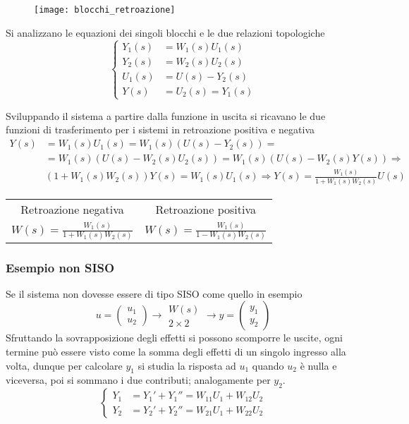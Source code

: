 \begin{figure}[h]
\centering
\texttt{[image: blocchi\_retroazione]}
\end{figure}

Si analizzano le equazioni dei singoli blocchi e le due relazioni topologiche
$$
\left\{\begin{aligned}
Y_1(s) &= W_1(s) U_1(s) \\
Y_2(s) &= W_2(s) U_2(s) \\
U_1(s) &= U(s) - Y_2(s) \\
Y(s) &= U_2(s) = Y_1(s)
\end{aligned}\right.
$$

Sviluppando il sistema a partire dalla funzione in uscita si ricavano le due
funzioni di trasferimento per i sistemi in retroazione positiva e negativa
$$
\begin{aligned}
Y(s) & = W_1(s) U_1(s) = W_1(s) (U(s) - Y_2(s)) =\\
&=
W_1(s) (U(s) - W_2(s)U_2(s)) = W_1(s)(U(s)-W_2(s)Y(s)) \Rightarrow \\
&(1+W_1(s)W_2(s))Y(s) = W_1(s) U_1(s) \Rightarrow
Y(s) = \frac{W_1(s)}{1+W_1(s)W_2(s)}U(s)
\end{aligned}
$$
\begin{table}[h]
\centering
\begin{tabular}{c|c}
Retroazione negativa & Retroazione positiva \\
$W(s) = \frac{W_1(s)}{1+W_1(s)W_2(s)}$ &
$W(s) = \frac{W_1(s)}{1-W_1(s)W_2(s)}$
\end{tabular}
\end{table}

\subsubsection{Esempio non SISO}
Se il sistema non dovesse essere di tipo SISO come quello in esempio
$$
u=\begin{pmatrix}
u_1 \\ u_2
\end{pmatrix} \rightarrow
\begin{matrix}W(s)\\2\times2
\end{matrix}
\rightarrow y = \begin{pmatrix}
y_1 \\ y_2
\end{pmatrix}
$$
Sfruttando la sovrapposizione degli effetti si possono scomporre le uscite,
ogni termine può essere visto come la somma degli effetti di un singolo
ingresso alla volta, dunque per calcolare $y_1$ si studia la risposta ad $u_1$
quando $u_2$ è nulla e viceversa, poi si sommano i due contributi; analogamente
per $y_2$.
$$\left\{\begin{aligned}
Y_1 &= Y_1' + Y_1'' = W_{11}U_1 + W_{12}U_2\\
Y_2 & = Y_2' + Y_2'' = W_{21}U_1 + W_{22}U_2
\end{aligned}\right.$$

